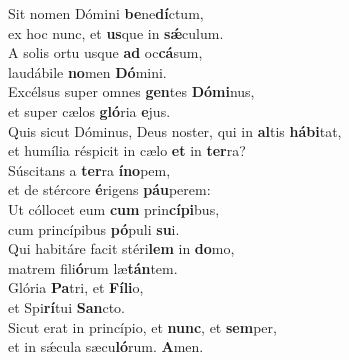 \evenverse Sit nomen Dómini \textbf{be}ne\textbf{dí}ctum,~\*\\
\evenverse ex hoc nunc, et \textbf{us}que in \textbf{sǽ}culum.\\
\oddverse A solis ortu usque \textbf{ad} oc\textbf{cá}sum,~\*\\
\oddverse laudábile \textbf{no}men \textbf{Dó}mini.\\
\evenverse Excélsus super omnes \textbf{gen}tes \textbf{Dó}\textbf{mi}nus,~\*\\
\evenverse et super cælos \textbf{gló}ria \textbf{e}jus.\\
\oddverse Quis sicut Dóminus, Deus noster, qui in \textbf{al}tis \textbf{há}\textbf{bi}tat,~\*\\
\oddverse et humília réspicit in cælo \textbf{et} in \textbf{ter}ra?\\
\evenverse Súscitans a \textbf{ter}ra \textbf{í}\textbf{no}pem,~\*\\
\evenverse et de stércore \textbf{é}rigens \textbf{páu}perem:\\
\oddverse Ut cóllocet eum \textbf{cum} prin\textbf{cí}\textbf{pi}bus,~\*\\
\oddverse cum princípibus \textbf{pó}puli \textbf{su}i.\\
\evenverse Qui habitáre facit stéri\textbf{lem} in \textbf{do}mo,~\*\\
\evenverse matrem fili\textbf{ó}rum læ\textbf{tán}tem.\\
\oddverse Glória \textbf{Pa}tri, et \textbf{Fí}\textbf{li}o,~\*\\
\oddverse et Spi\textbf{rí}tui \textbf{San}cto.\\
\evenverse Sicut erat in princípio, et \textbf{nunc}, et \textbf{sem}per,~\*\\
\evenverse et in sǽcula sæcu\textbf{ló}rum. \textbf{A}men.\\
